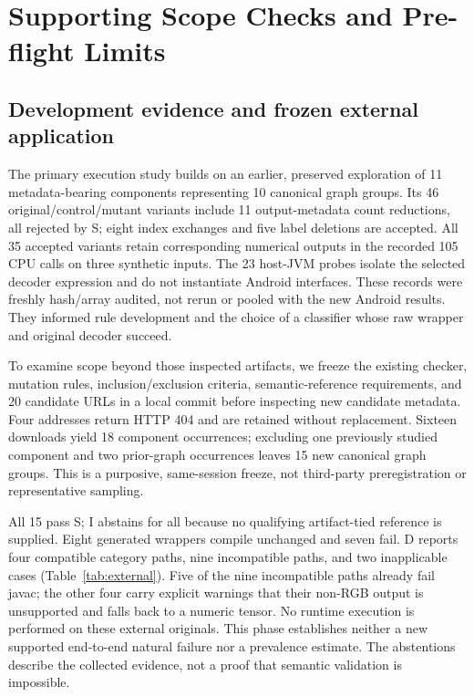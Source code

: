 \documentclass[10pt,twocolumn,letterpaper]{article}
\begin{document}
\section{Supporting Scope Checks and Pre-flight Limits}
\label{sec:scope}
\subsection{Development evidence and frozen external application}
The primary execution study builds on an earlier, preserved exploration of 11 metadata-bearing components representing 10 canonical graph groups. Its 46 original/control/mutant variants include 11 output-metadata count reductions, all rejected by S; eight index exchanges and five label deletions are accepted. All 35 accepted variants retain corresponding numerical outputs in the recorded 105 CPU calls on three synthetic inputs. The 23 host-JVM probes isolate the selected decoder expression and do not instantiate Android interfaces. These records were freshly hash/array audited, not rerun or pooled with the new Android results. They informed rule development and the choice of a classifier whose raw wrapper and original decoder succeed.

To examine scope beyond those inspected artifacts, we freeze the existing checker, mutation rules, inclusion/exclusion criteria, semantic-reference requirements, and 20 candidate URLs in a local commit before inspecting new candidate metadata. Four addresses return HTTP 404 and are retained without replacement. Sixteen downloads yield 18 component occurrences; excluding one previously studied component and two prior-graph occurrences leaves 15 new canonical graph groups. This is a purposive, same-session freeze, not third-party preregistration or representative sampling.

All 15 pass S; I abstains for all because no qualifying artifact-tied reference is supplied. Eight generated wrappers compile unchanged and seven fail. D reports four compatible category paths, nine incompatible paths, and two inapplicable cases (Table~\ref{tab:external}). Five of the nine incompatible paths already fail javac; the other four carry explicit warnings that their non-RGB output is unsupported and falls back to a numeric tensor. No runtime execution is performed on these external originals. This phase establishes neither a new supported end-to-end natural failure nor a prevalence estimate. The abstentions describe the collected evidence, not a proof that semantic validation is impossible.
\end{document}
